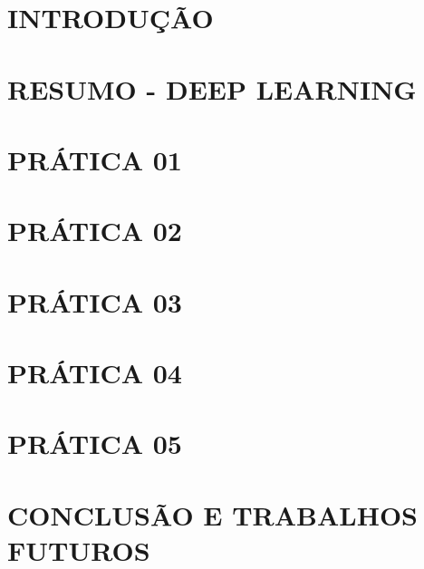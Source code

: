 \documentclass[a4paper, 12 pt, conference]{ieeeconf}  %
\begin{document}
\section{INTRODUÇÃO}


\section{RESUMO - DEEP LEARNING}


\section{PRÁTICA 01}
\label{pratica01}


\section{PRÁTICA 02}
\label{pratica02}


\section{PRÁTICA 03}
\label{pratica03}


\section{PRÁTICA 04}
\label{pratica04}


\section{PRÁTICA 05}
\label{pratica05}


\section{CONCLUSÃO E TRABALHOS FUTUROS}




\end{document}

